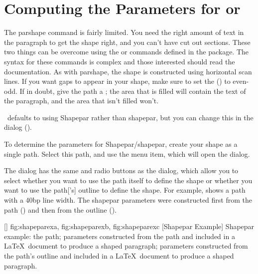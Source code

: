 
\section{Computing the Parameters for  or
}
\label{sec:shapepar}


The \gls{parshape} command is fairly limited. You need the right
amount of text in the paragraph to get the shape right, and you
can't have cut out sections. These two things can be overcome using
the  or  commands
defined in the  package. The syntax for these commands
is complex and those interested should read the 
documentation. As with \gls{parshape}, the shape is constructed
using horizontal scan lines. If you want gaps to appear in your
shape, make sure to set the 
() to even-odd.  If in doubt, give the
\gls{path} a ; the area that is filled will
contain the text of the paragraph, and the area that isn't filled
won't.

\begin{information}
\FlowframTk\ defaults to using \gls{Shapepar} rather than
\gls{shapepar}, but you can change this in the
 dialog ().
\end{information}

To determine the parameters for \gls{Shapepar}\slash\gls{shapepar}, create
your shape as a single \gls*{path}. Select this \gls*{path}, and use
the  menu item, which will open the
 dialog.


The  dialog has the same 
and  radio buttons as the
 dialog, which allow you to select
whether you want to use the \gls*{path} itself to define the shape
or whether you want to use the \gls*{path}['s] outline to define the shape.
For example,  shows a \gls*{path} with a
40bp line width. The \gls{shapepar} parameters were constructed
first from the \gls*{path} () and then from
the outline ().

[\small]
{
  {fig:shapeparexa}{}{},
  {fig:shapeparexb}{}{},
  {fig:shapeparexc}{}{}
}
[Shapepar Example]
{Shapepar example:
 the path;
 parameters constructed from the path and included in a
\LaTeX\ document to produce a shaped paragraph;
parameters constructed from the path's outline and included in a
\LaTeX\ document to produce a shaped paragraph.}

